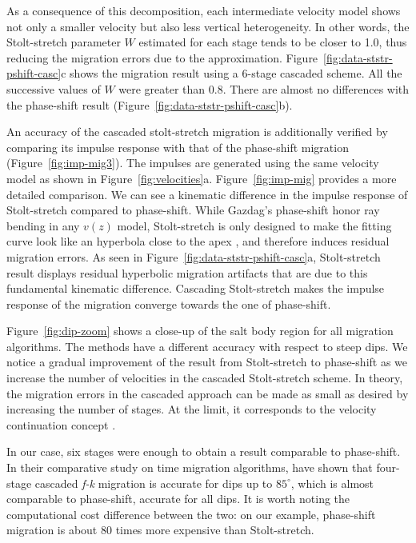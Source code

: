 \par
As a consequence of this decomposition, each intermediate velocity
model shows not only a smaller velocity but also less vertical
heterogeneity. In other words, the Stolt-stretch parameter $W$
estimated for each stage tends to be closer to 1.0, thus reducing the
migration errors due to the
approximation. Figure~\ref{fig:data-ststr-pshift-casc}c shows the
migration result using a 6-stage cascaded scheme. All the successive
values of $W$ were greater than 0.8. There are almost no
differences with the phase-shift result
(Figure~\ref{fig:data-ststr-pshift-casc}b).
\par
An accuracy of the cascaded stolt-stretch migration is additionally
verified by comparing its impulse response with that of the
phase-shift migration (Figure~\ref{fig:imp-mig3}). The impulses are
generated using the same velocity model as shown in
Figure~\ref{fig:velocities}a.  Figure~\ref{fig:imp-mig} provides a
more detailed comparison. We can see a kinematic difference in the
impulse response of Stolt-stretch compared to phase-shift.  While
Gazdag's phase-shift honor ray bending in any $v(z)$ model,
Stolt-stretch is only designed to make the fitting curve look like an
hyperbola close to the apex \cite{Levin.sep.35.195}, and therefore
induces residual migration errors.  As seen in
Figure~\ref{fig:data-ststr-pshift-casc}a, Stolt-stretch result
displays residual hyperbolic migration artifacts that are due to this
fundamental kinematic difference. Cascading Stolt-stretch makes the
impulse response of the migration converge towards the one of
phase-shift.

Figure~\ref{fig:dip-zoom} shows a close-up of the salt body region for
all migration algorithms. The methods have a different accuracy with
respect to steep dips. We notice a gradual improvement of the result
from Stolt-stretch to phase-shift as we increase the number of
velocities in the cascaded Stolt-stretch scheme. In theory, the
migration errors in the cascaded approach can be made as small as
desired by increasing the number of stages. At the limit, it
corresponds to the velocity continuation concept
\cite{me,SEG-1997-1762}.
\par
In our case, six stages were enough to obtain a result comparable to
phase-shift. In their comparative study on time migration algorithms,
 have shown that four-stage cascaded {\it
  f-k} migration is accurate for dips up to $85^\circ$, which is
almost comparable to phase-shift, accurate for all dips.  It is worth
noting the computational cost difference between the two: on our
example, phase-shift migration is about 80 times more expensive than
Stolt-stretch.

